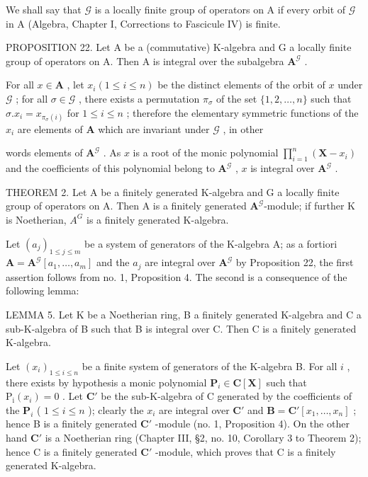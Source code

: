 We shall say that \(\mathcal{G}\) is a locally finite group of operators on A if every orbit of \(\mathcal{G}\) in A (Algebra, Chapter I, Corrections to Fascicule IV) is finite.

PROPOSITION 22. Let A be a (commutative) K-algebra and G a locally finite group of operators on A. Then A is integral over the subalgebra \(\mathbf{A}^{\mathcal{G}}\) .

For all \(x \in \mathbf{A}\) , let \(x_{i} (1 \leqslant i \leqslant n)\) be the distinct elements of the orbit of \(x\) under \(\mathcal{G}\) ; for all \(\sigma \in \mathcal{G}\) , there exists a permutation \(\pi_{\sigma}\) of the set \(\{1, 2, \ldots, n\}\) such that \(\sigma. x_{i} = x_{\pi_{\sigma}(i)}\) for \(1 \leqslant i \leqslant n\) ; therefore the elementary symmetric functions of the \(x_{i}\) are elements of \(\mathbf{A}\) which are invariant under \(\mathcal{G}\) , in other

words elements of \(\mathbf{A}^{\mathcal{G}}\) . As \(x\) is a root of the monic polynomial \(\prod_{i=1}^{n} (\mathbf{X} - x_i)\) and the coefficients of this polynomial belong to \(\mathbf{A}^{\mathcal{G}}\) , \(x\) is integral over \(\mathbf{A}^{\mathcal{G}}\) .

THEOREM 2. Let A be a finitely generated K-algebra and G a locally finite group of operators on A. Then A is a finitely generated \(\mathbf{A}^{\mathcal{G}}\)-module; if further K is Noetherian, \(A^{G}\) is a finitely generated K-algebra.

Let \((a_{j})_{1\leqslant j\leqslant m}\) be a system of generators of the K-algebra A; as a fortiori \(\mathbf{A} = \mathbf{A}^{\mathcal{G}}[a_1,\ldots ,a_m]\) and the \(a_{j}\) are integral over \(\mathbf{A}^{\mathcal{G}}\) by Proposition 22, the first assertion follows from no. 1, Proposition 4. The second is a consequence of the following lemma:

LEMMA 5. Let K be a Noetherian ring, B a finitely generated K-algebra and C a sub-K-algebra of B such that B is integral over C. Then C is a finitely generated K-algebra.

Let \((x_{i})_{1\leqslant i\leqslant n}\) be a finite system of generators of the K-algebra B. For all \(i\) , there exists by hypothesis a monic polynomial \(\mathbf{P}_i\in \mathbf{C}[\mathbf{X}]\) such that \(\mathrm{P_i}(x_i) = 0\) . Let \(\mathbf{C}'\) be the sub-K-algebra of C generated by the coefficients of the \(\mathbf{P}_i\) ( \(1\leqslant i\leqslant n\) ); clearly the \(x_{i}\) are integral over \(\mathbf{C}'\) and \(\mathbf{B} = \mathbf{C}'[x_1,\dots,x_n]\) ; hence B is a finitely generated \(\mathbf{C}'\) -module (no. 1, Proposition 4). On the other hand \(\mathbf{C}'\) is a Noetherian ring (Chapter III, §2, no. 10, Corollary 3 to Theorem 2); hence C is a finitely generated \(\mathbf{C}'\) -module, which proves that C is a finitely generated K-algebra.

